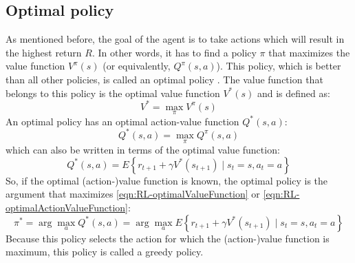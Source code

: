 \subsection{Optimal policy}\label{sec:RL-Optimal_policy}
As mentioned before, the goal of the agent is to take actions which will result in the highest return $R$. In other words, it has to find a policy $\pi$ that maximizes the value function $V^\pi(s)$ (or equivalently, $Q^\pi(s,a)$). This policy, which is better than all other policies, is called an optimal policy . The value function that belongs to this policy is the optimal value function $V^*(s)$ and is defined as:
\begin{equation}\label{eqn:RL-optimalValueFunction}
	V^*=\max_{\pi} V^\pi(s)
\end{equation}
An optimal policy has an optimal action-value function $Q^*(s,a)$:
\begin{equation}\label{eqn:RL-optimalActionValueFunction} 
	Q^*(s,a) = \max_{\pi} Q^\pi(s,a) 
\end{equation}
which can also be written in terms of the optimal value function:
$$%
	Q^*(s,a) = E \left\{ r_{t+1} + \gamma V^* (s_{t+1}) \mid s_t=s,a_t=a \right\} 
$$%
So, if the optimal (action-)value function is known, the optimal policy is the argument that maximizes \eqref{eqn:RL-optimalValueFunction} or \eqref{eqn:RL-optimalActionValueFunction}:
$$%
	\pi^* = \arg\max_a Q^*(s,a) = \arg\max_a E \left\{ r_{t+1} + \gamma V^* (s_{t+1}) \mid s_t=s,a_t=a \right\} 
$$%
Because this policy selects the action for which the (action-)value function is maximum, this policy is called a greedy policy.

